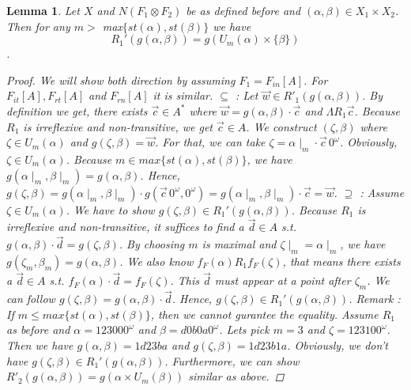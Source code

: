 \documentclass[12pt, a4paper]{scrartcl}
\newtheorem{lemma}[definition]{Lemma}
\begin{document}
\begin{lemma}
    Let $X$ and $N(F_1 \otimes F_2)$ be as defined before and $(\alpha,\beta) \in X_1 \times X_2$. Then for any $m >$ max$\{st(\alpha), st(\beta)\}$ we have 
    $$R_1'(g(\alpha,\beta)) = g(U_m(\alpha) \times \{\beta\})$$.
    \begin{proof}
        We will show both direction by assuming $F_1 = F_{in}[A]$. For $F_{it}[A],F_{rt}[A]$ and $F_{rn}[A]$ it is similar. \newline
        $\subseteq$ : Let $\vec{w} \in R'_1(g(\alpha,\beta))$. By definition we get, there exists $\vec{c} \in A^*$ where $\vec{w} = g(\alpha,\beta) \cdot \vec{c}$ and $\Lambda R_1 \vec{c}$.
        Because $R_1$ is irreflexive and non-transitive, we get $\vec{c} \in A$. We construct $(\zeta,\beta)$ where $\zeta \in U_m(\alpha)$ and $g(\zeta,\beta) = \vec{w}$. For that, we can take $\zeta = \alpha \mid_m \cdot \vec{c}\, 0^\omega$. Obviously, $\zeta \in U_m(\alpha)$.
        Because $m \in max\{st(\alpha), st(\beta)\}$, we have $g(\alpha \mid_m, \beta \mid_m) = g(\alpha, \beta)$. Hence, $g(\zeta, \beta) = g(\alpha \mid_m, \beta \mid_m) \cdot g(\vec{c} \,0^\omega, 0^\omega) = g(\alpha \mid_m, \beta \mid_m) \cdot \vec{c} = \vec{w}$.
        \newline \newline
        $\supseteq$ : Assume $\zeta \in U_m(\alpha)$. We have to show $g(\zeta, \beta) \in R_1'(g(\alpha, \beta))$. Because $R_1$ is irreflexive and non-transitive, it suffices to find a $\vec{d} \in A$ s.t. $g(\alpha,\beta) \cdot \vec{d} = g(\zeta, \beta)$.
        By choosing $m$ is maximal and $\zeta \mid_m = \alpha \mid_m$, we have $g(\zeta_m, \beta_m) = g(\alpha,\beta)$. We also know $f_F(\alpha)R_1 f_F(\zeta)$, that means there exists a $\vec{d} \in A$ s.t. $f_F(\alpha) \cdot \vec{d} = f_F(\zeta)$. This $\vec{d}$ must appear at a point after $\zeta_m$.
        We can follow $g(\zeta, \beta) = g(\alpha, \beta) \cdot \vec{d}$. Hence, $g(\zeta, \beta) \in R_1'(g(\alpha,\beta))$.
        \newline \newline
        Remark : If $m \leq max\{st(\alpha), st(\beta)\}$, then we cannot gurantee the equality. Assume $R_1$ as before and $\alpha = 123000^\omega$ and $\beta = d0b0a0^\omega$.
        Lets pick $m = 3$ and $\zeta = 123100^\omega$. Then we have $g(\alpha, \beta) = 1d23ba$ and $g(\zeta, \beta) = 1d23b1a$. Obviously, we don't have $g(\zeta, \beta) \in R_1'(g(\alpha,\beta))$. \newline
        Furthermore, we can show $R'_2(g(\alpha,\beta)) = g(\alpha \times U_m(\beta))$ similar as above. 
        
    \end{proof}


\end{lemma}
\end{document}
